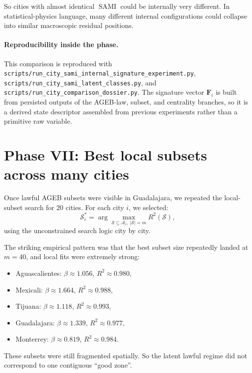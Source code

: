 \documentclass[11pt]{article}
\newcommand{\SAMI}{\operatorname{SAMI}}
\begin{document}
So cities with almost identical \(\SAMI\) could be internally very different. In statistical-physics language, many different internal configurations could collapse into similar macroscopic residual positions.

\paragraph{Reproducibility inside the phase.}
This comparison is reproduced with
\texttt{scripts/run\_city\_sami\_internal\_signature\_experiment.py},
\texttt{scripts/run\_city\_sami\_latent\_classes.py},
and
\texttt{scripts/run\_city\_comparison\_dossier.py}.
The signature vector \(\mathbf{F}_i\) is built from persisted outputs of the AGEB-law, subset, and centrality branches, so it is a derived state descriptor assembled from previous experiments rather than a primitive raw variable.

\section{Phase VII: Best local subsets across many cities}

Once lawful AGEB subsets were visible in Guadalajara, we repeated the local-subset search for \(20\) cities. For each city \(i\), we selected:
\begin{equation}
\mathcal{S}_i^\ast
=
\arg\max_{\mathcal{S}\subseteq \mathcal{A}_i,\ |\mathcal{S}|=m}
R^2(\mathcal{S}),
\end{equation}
using the unconstrained search logic city by city.

The striking empirical pattern was that the best subset size repeatedly landed at \(m=40\), and local fits were extremely strong:
\begin{itemize}
\item Aguascalientes: \(\beta \approx 1.056\), \(R^2 \approx 0.980\),
\item Mexicali: \(\beta \approx 1.664\), \(R^2 \approx 0.988\),
\item Tijuana: \(\beta \approx 1.118\), \(R^2 \approx 0.993\),
\item Guadalajara: \(\beta \approx 1.339\), \(R^2 \approx 0.977\),
\item Monterrey: \(\beta \approx 0.819\), \(R^2 \approx 0.984\).
\end{itemize}

These subsets were still fragmented spatially. So the latent lawful regime did not correspond to one contiguous ``good zone''.
\end{document}
